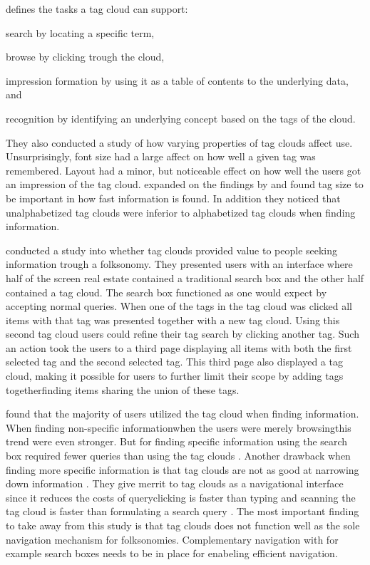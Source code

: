\citet[]{rivadeneira07} defines the tasks a tag cloud can support:
  \begin{inparaenum}[(i)]
    \item search by locating a specific term,
    \item browse by clicking trough the cloud,
    \item impression formation by using it as a table of contents
      to the underlying data, and
    \item recognition by identifying an underlying concept based on
      the tags of the cloud.
  \end{inparaenum}
They also conducted a study of how varying properties of tag clouds affect
use. Unsurprisingly, font size had a large affect on how well a
given tag was remembered. Layout had a minor, but noticeable effect on
how well the users got an impression of the tag cloud.
\citet[]{halvey07} expanded on the findings by
\citeauthor{rivadeneira07} and found tag size to be important in how
fast information is found. In addition they noticed that unalphabetized
tag clouds were inferior to alphabetized tag clouds when finding information.

\citet[]{sinclair08} conducted a study into whether tag clouds provided
value to people seeking information trough a folksonomy. They presented users
with an interface where half of the screen real estate contained a traditional
search box and the other half contained a tag cloud. The search box functioned
as one would expect by accepting normal queries. When one of the tags in the
tag cloud was clicked all items with that tag was presented together with a
new tag cloud. Using this second tag cloud users could refine their tag search
by clicking another tag. Such an action took the users to a third page
displaying all items with both the first selected tag and the second selected
tag. This third page also displayed a tag cloud, making it possible for users
to further limit their scope by adding tags together\dash{}finding items
sharing the union of these tags.

\citet[]{sinclair08} found that the majority of users utilized the
tag cloud when finding information. When finding non-specific
information\dash{}when the users were merely browsing\dash{}this trend were
even stronger. But for finding specific information using the search box
required fewer queries than using the tag clouds
\citeyearpar[]{sinclair08}. Another drawback when finding more specific
information is that tag clouds are not as good at narrowing down information
\citeyearpar[]{sinclair08}.
They give merrit to tag clouds as a navigational interface since it
reduces the costs of query\dash{}clicking is faster than typing and scanning
the tag cloud is faster than formulating a search query
\citeyearpar[]{sinclair08}.
The most important finding to take away from this study is that tag clouds
does not function well as the sole navigation mechanism for folksonomies.
Complementary navigation with for example search boxes needs to be in place
for enabeling efficient navigation.


